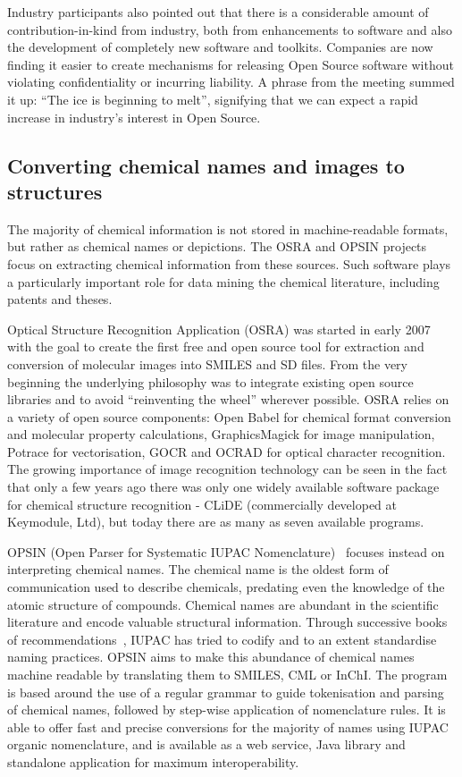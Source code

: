 \documentclass[10pt]{bmc_article}
\newenvironment{bmcformat}{\fussy\setboolean{publ}{true}}{\fussy}
\begin{document}
\begin{bmcformat}
Industry participants also pointed out that 
there is a considerable amount of
contribution-in-kind from industry, both from
enhancements to software and also the development of completely new
software and toolkits. Companies are now finding it easier to create
mechanisms for releasing Open Source software
without violating confidentiality or incurring liability.
A phrase from the meeting
summed it up: ``The ice is beginning to melt'', signifying that we can
expect a rapid increase in industry's interest
in Open Source.

\subsection*{Converting chemical names and images to structures}

The majority of chemical information is not stored in machine-readable
formats, but rather as chemical names or depictions. The OSRA and OPSIN
projects focus on extracting chemical information from these sources.
Such software plays a particularly important role for data mining the
chemical literature, including patents and theses.

Optical Structure Recognition Application (OSRA) \cite{WebOSRA} was started
in early 2007 with the goal to create the first free and open source
tool for extraction and conversion of molecular images into SMILES and
SD files. From the very beginning the underlying philosophy was to integrate
existing open source libraries and to avoid ``reinventing the wheel''
wherever possible. OSRA relies on a variety of open source components:
Open Babel for chemical format
conversion and molecular property calculations, GraphicsMagick for image
manipulation, Potrace for vectorisation, GOCR and OCRAD for optical
character recognition. The growing importance of image
recognition technology can be seen in the fact that
only a few years ago there was only one widely available software
package for chemical structure recognition -  CLiDE (commercially
developed at Keymodule, Ltd), but today there are as many as seven
available programs.

OPSIN (Open Parser for Systematic IUPAC
Nomenclature)~\cite{lowe_chemical_2011} focuses instead on interpreting chemical names.
The chemical name is the oldest form of communication used to
describe chemicals, predating
even the knowledge of the atomic structure of compounds.
Chemical names are abundant in the scientific
literature and encode valuable structural information.
Through successive books of
recommendations~\cite{iupac_nomenclature_1979, iupac_guide_1993},
IUPAC has tried to codify and to an extent standardise naming practices.
OPSIN aims to make this abundance of
chemical names machine readable by translating them to SMILES, CML or
InChI. The program is based around the use of a regular grammar to
guide tokenisation and parsing of chemical names, followed by
step-wise application of nomenclature rules. It is able to offer
fast and precise conversions for the majority of names using IUPAC
organic nomenclature, and is available as a web service, Java
library and standalone application for maximum interoperability.


\end{bmcformat}
\end{document}

